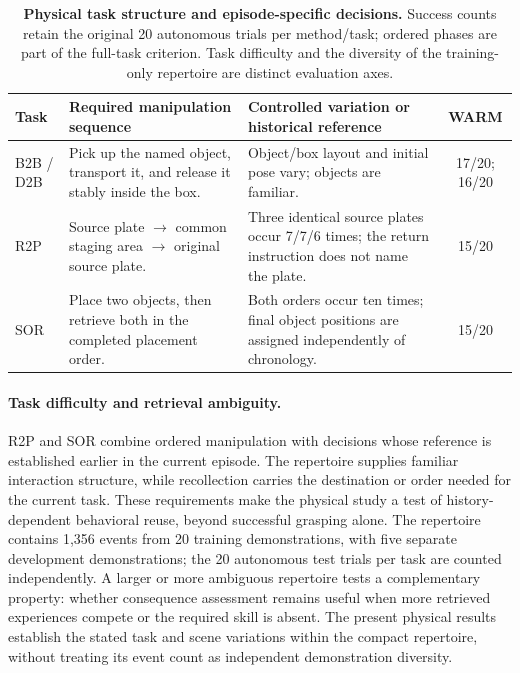\begin{table}[!ht]
\centering\small
\caption{\textbf{Physical task structure and episode-specific decisions.}
Success counts retain the original 20 autonomous trials per method/task; ordered phases are part of the full-task criterion.
Task difficulty and the diversity of the training-only repertoire are distinct evaluation axes.}
\label{tab:realworld_dependency}
\begin{tabularx}{\linewidth}{@{}lXXc@{}}
\toprule
Task & Required manipulation sequence & Controlled variation or historical reference & WARM \\
\midrule
B2B / D2B & Pick up the named object, transport it, and release it stably inside the box. & Object/box layout and initial pose vary; objects are familiar. & 17/20; 16/20 \\
R2P & Source plate $\rightarrow$ common staging area $\rightarrow$ original source plate. & Three identical source plates occur 7/7/6 times; the return instruction does not name the plate. & 15/20 \\
SOR & Place two objects, then retrieve both in the completed placement order. & Both orders occur ten times; final object positions are assigned independently of chronology. & 15/20 \\
\bottomrule
\end{tabularx}
\end{table}

\paragraph{Task difficulty and retrieval ambiguity.}
R2P and SOR combine ordered manipulation with decisions whose reference is established earlier in the current episode.
The repertoire supplies familiar interaction structure, while recollection carries the destination or order needed for the current task.
These requirements make the physical study a test of history-dependent behavioral reuse, beyond successful grasping alone.
The repertoire contains 1,356 events from 20 training demonstrations, with five separate development demonstrations; the 20 autonomous test trials per task are counted independently.
A larger or more ambiguous repertoire tests a complementary property: whether consequence assessment remains useful when more retrieved experiences compete or the required skill is absent.
The present physical results establish the stated task and scene variations within the compact repertoire, without treating its event count as independent demonstration diversity.

